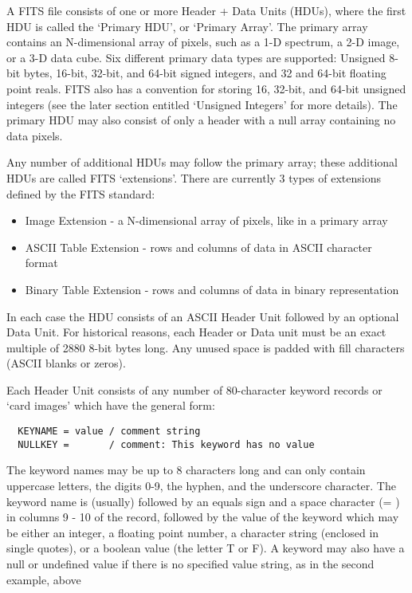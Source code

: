 \documentclass[11pt]{book}
\begin{document}
A FITS file consists of one or more Header + Data Units (HDUs), where
the first HDU is called the `Primary HDU', or `Primary Array'.  The
primary array contains an N-dimensional array of pixels, such as a 1-D
spectrum, a 2-D image, or a 3-D data cube.  Six different primary
data types are supported: Unsigned 8-bit bytes, 16-bit, 32-bit, and 64-bit signed
integers, and 32 and 64-bit floating point reals.  FITS also has a
convention for storing 16, 32-bit, and 64-bit unsigned integers (see the later
section entitled `Unsigned Integers' for more details). The primary HDU
may also consist of only a header with a null array containing no
data pixels.

Any number of additional HDUs may follow the primary array; these
additional HDUs are called FITS `extensions'.  There are currently 3
types of extensions defined by the FITS standard:

\begin{itemize}
\item
  Image Extension - a N-dimensional array of pixels, like in a primary array
\item
  ASCII Table Extension - rows and columns of data in ASCII character format
\item
  Binary Table Extension - rows and columns of data in binary representation
\end{itemize}

In each case the HDU consists of an ASCII Header Unit followed by an optional
Data Unit.  For historical reasons, each Header or Data unit must be an
exact multiple of 2880 8-bit bytes long.  Any unused space is padded
with fill characters (ASCII blanks or zeros).

Each Header Unit consists of any number of 80-character keyword records
or `card images' which have the
general form:

\begin{verbatim}
  KEYNAME = value / comment string
  NULLKEY =       / comment: This keyword has no value
\end{verbatim}
The keyword names may be up to 8 characters long and can only contain
uppercase letters, the digits 0-9, the hyphen, and the underscore
character. The keyword name is (usually) followed by an equals sign and
a space character (= ) in columns 9 - 10 of the record, followed by the
value of the keyword which may be either an integer, a floating point
number, a character string (enclosed in single quotes), or a boolean
value (the letter T or F).   A keyword may also have a null or undefined
value if there is no specified value string, as in the second example, above
\end{document}
